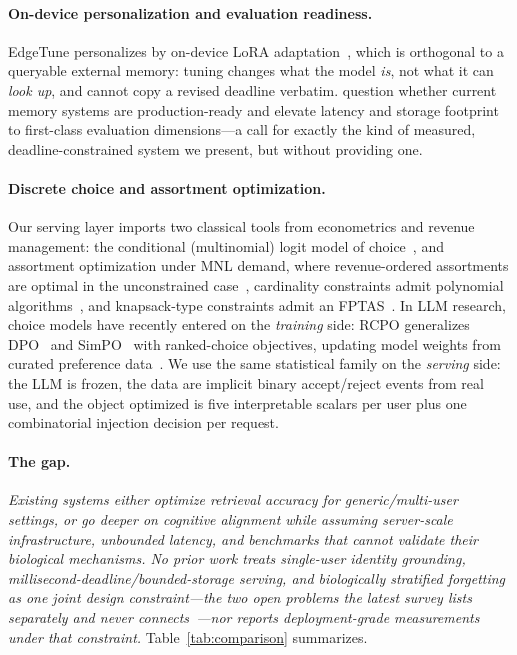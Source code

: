 \documentclass[letterpaper]{article}
\begin{document}
\paragraph{On-device personalization and evaluation readiness.}
EdgeTune personalizes by on-device LoRA adaptation~\citep{edgetune2026},
which is orthogonal to a queryable external memory: tuning changes what
the model \emph{is}, not what it can \emph{look up}, and cannot copy a
revised deadline verbatim. \citet{zhou2026ready} question whether current
memory systems are production-ready and elevate latency and storage
footprint to first-class evaluation dimensions---a call for exactly the
kind of measured, deadline-constrained system we present, but without
providing one.

\paragraph{Discrete choice and assortment optimization.}
Our serving layer imports two classical tools from econometrics and
revenue management: the conditional (multinomial) logit model of
choice~\citep{mcfadden1974conditional}, and assortment optimization under
MNL demand, where revenue-ordered assortments are optimal in the
unconstrained case~\citep{talluri2004revenue}, cardinality constraints
admit polynomial algorithms~\citep{rusmevichientong2010dynamic}, and
knapsack-type constraints admit an FPTAS~\citep{desir2020capacitated}.
In LLM research, choice models have recently entered on the
\emph{training} side: RCPO generalizes DPO~\citep{rafailov2023direct} and
SimPO~\citep{meng2024simpo} with ranked-choice objectives, updating model
weights from curated preference data~\citep{tang2026rcpo}. We use the same
statistical family on the \emph{serving} side: the LLM is frozen, the data
are implicit binary accept/reject events from real use, and the object
optimized is five interpretable scalars per user plus one combinatorial
injection decision per request.

\paragraph{The gap.}
\emph{Existing systems either optimize retrieval accuracy for
generic/multi-user settings, or go deeper on cognitive alignment while
assuming server-scale infrastructure, unbounded latency, and benchmarks
that cannot validate their biological mechanisms. No prior work treats
single-user identity grounding, millisecond-deadline/bounded-storage
serving, and biologically stratified forgetting as one joint design
constraint---the two open problems the latest survey lists separately and
never connects~\citep{du2026survey}---nor reports deployment-grade
measurements under that constraint.} Table~\ref{tab:comparison}
summarizes.
\end{document}
